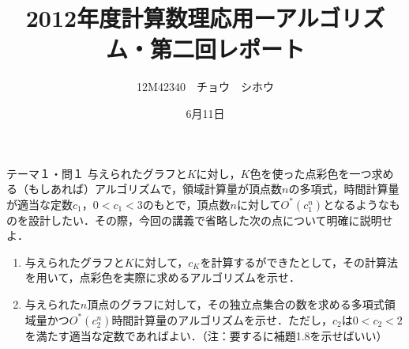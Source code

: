 \documentclass[a4paper,11pt]{jsarticle}
\title{2012年度計算数理応用ーアルゴリズム・第二回レポート}
\author{12M42340　チョウ　シホウ}
\date{6月11日}
\numberwithin{theorem}{section}  %
\numberwithin{equation}{section} %
\begin{document}
{}
\renewcommand{\thepart}{\arabic{part}}

\begin{itembox}[l]{テーマ１・問１}
与えられたグラフと$K$に対し，$K$色を使った点彩色を一つ求める（もしあれば）アルゴリズムで，領域計算量が頂点数$n$の多項式，時間計算量が適当な定数$c_1$，$0 < c_1 < 3$のもとで，頂点数$n$に対して$O^*(c_1^n)$となるようなものを設計したい．その際，今回の講義で省略した次の点について明確に説明せよ．
\begin{enumerate}
\item 与えられたグラフと$K$に対して，$c_K$を計算するができたとして，その計算法を用いて，点彩色を実際に求めるアルゴリズムを示せ．
\item 与えられた$n$頂点のグラフに対して，その独立点集合の数を求める多項式領域量かつ$O^*(c_2^n)$時間計算量のアルゴリズムを示せ．ただし，$c_2$は$0<c_2<2$を満たす適当な定数であればよい．（注：要するに補題1.8を示せばいい）
\end{enumerate}
\end{itembox}
\end{document}
